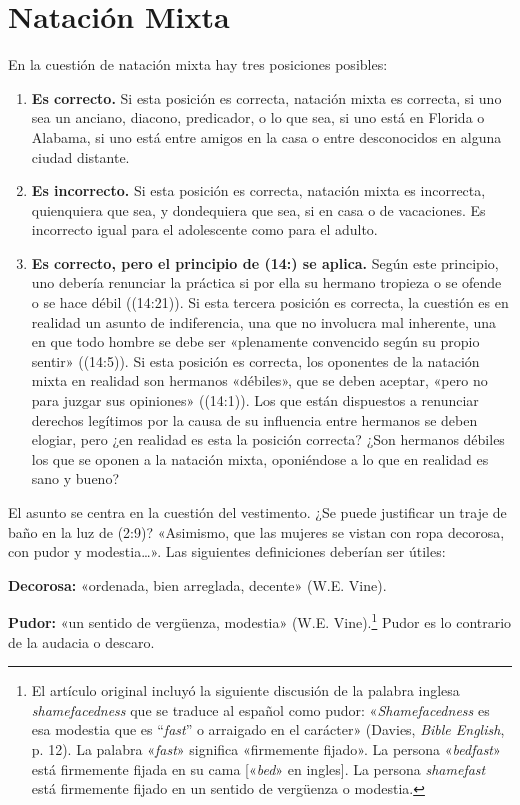 \documentclass[12pt, twoside, openright]{book}
\begin{document}
\section{Natación Mixta}
En la cuestión de natación mixta hay tres posiciones posibles:
\begin{enumerate}
\item \textbf{Es correcto.} Si esta posición es correcta, natación mixta es correcta, si uno sea un anciano, diacono, predicador, o lo que sea, si uno está en Florida o Alabama, si uno está entre amigos en la casa o entre desconocidos en alguna ciudad distante. 
\item \textbf{Es incorrecto.} Si esta posición es correcta, natación mixta es incorrecta, quienquiera que sea, y dondequiera que sea, si en casa o de vacaciones. Es incorrecto igual para el adolescente como para el adulto. 
\item \textbf{Es correcto, pero el principio de (14:) se aplica.} Según este principio, uno debería renunciar la práctica si por ella su hermano tropieza o se ofende o se hace débil ((14:21)). Si esta tercera posición es correcta, la cuestión es en realidad un asunto de indiferencia, una que no involucra mal inherente, una en que todo hombre se debe ser «plenamente convencido según su propio sentir» ((14:5)). Si esta posición es correcta, los oponentes de la natación mixta en realidad son hermanos «débiles», que se deben aceptar, «pero no para juzgar sus opiniones» ((14:1)). Los que están dispuestos a renunciar derechos legítimos por la causa de su influencia entre hermanos se deben elogiar, pero ¿en realidad es esta la posición correcta? ¿Son hermanos débiles los que se oponen a la natación mixta, oponiéndose a lo que en realidad es sano y bueno?
\end{enumerate}
El asunto se centra en la cuestión del vestimento. ¿Se puede justificar un traje de baño en la luz de (2:9)? «Asimismo, que las mujeres se vistan con ropa decorosa, con pudor y modestia…». Las siguientes definiciones deberían ser útiles:

\textbf{Decorosa:} «ordenada, bien arreglada, decente» (W.E. Vine).

\textbf{Pudor:} «un sentido de vergüenza, modestia» (W.E. Vine).\footnote{El artículo original incluyó la siguiente discusión de la palabra inglesa \textit{shamefacedness} que se traduce al español como pudor: «\textit{Shamefacedness} es esa modestia que es “\textit{fast}” o arraigado en el carácter» (Davies, \textit{Bible English}, p. 12). La palabra «\textit{fast}» significa «firmemente fijado». La persona «\textit{bedfast}» está firmemente fijada en su cama [«\textit{bed}» en ingles]. La persona \textit{shamefast} está firmemente fijado en un sentido de vergüenza o modestia.} Pudor es lo contrario de la audacia o descaro.
\end{document}
